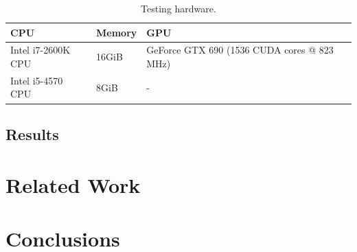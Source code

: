 \begin{table}
\footnotesize
\centering
\begin{tabular}{| l | l | l | l |}
\hline
\textbf{CPU} & \textbf{Memory} & \textbf{GPU}\\
\hline
Intel i7-2600K CPU & 16GiB & GeForce GTX 690 (1536 CUDA cores @ 823 MHz)\\
Intel i5-4570 CPU & 8GiB & -\\
\hline
\end{tabular}
\caption{Testing hardware.}
\end{table}

\subsection*{Results}

\section*{Related Work}

\cite{Lutz2013}

\cite{Kamil2010}

\cite{Dastgeer2011}

\cite{Christen2011}


\cite{Chan2009}


\cite{Collins2013}


\cite{Magni2014}

\section*{Conclusions}


\label{bibliography}
\printbibliography


